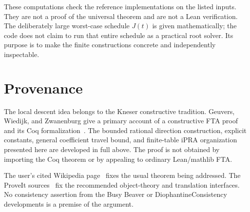 \documentclass[11pt,letterpaper]{article}
\theoremstyle{definition}\newtheorem{definition}[theorem]{Definition}
\theoremstyle{remark}\newtheorem{remark}[theorem]{Remark}
\begin{document}
These computations check the reference implementations on the listed
inputs. They are not a proof of the universal theorem and are not a Lean
verification. The deliberately large worst-case schedule $J(t)$ is given
mathematically; the code does not claim to run that entire schedule as a
practical root solver. Its purpose is to make the finite constructions
concrete and independently inspectable.

\section*{Provenance}

The local descent idea belongs to the Kneser constructive tradition.
Geuvers, Wiedijk, and Zwanenburg give a primary account of a constructive
FTA proof and its Coq formalization~\cite{kneser}. The bounded rational
direction construction, explicit constants, general coefficient travel
bound, and finite-table iPRA organization presented here are developed
in full above. The proof is not obtained by importing the Coq theorem or
by appealing to ordinary Lean/mathlib FTA.

The user's cited Wikipedia page~\cite{wikipedia} fixes the usual theorem
being addressed. The ProveIt sources~\cite{proveit-pr,proveit-deduction,
proveit-bi,proveit-native} fix the recommended object-theory and translation
interfaces. No consistency assertion from the Busy Beaver or
DiophantineConsistency developments is a premise of the argument.
\end{document}
